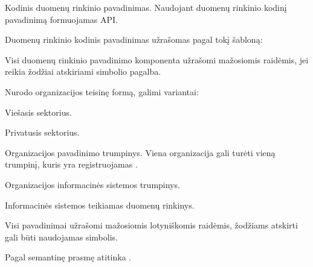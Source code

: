 \documentclass[letterpaper,10pt,lithuanian]{sphinxmanual}
\begin{document}
\begin{fulllineitems}
\label{\detokenize{formatas:dataset}}
\pysigstartsignatures
{}
\pysigstopsignatures
\sphinxAtStartPar
{}

\sphinxAtStartPar
Kodinis duomenų rinkinio pavadinimas. Naudojant duomenų rinkinio kodinį
pavadinimą formuojamas API.

\sphinxAtStartPar
Duomenų rinkinio kodinis pavadinimas užrašomas pagal tokį šabloną:

\sphinxAtStartPar
{}  \sphinxcode{\sphinxupquote{/}}  \sphinxcode{\sphinxupquote{/}}  \sphinxcode{\sphinxupquote{/}} 

\sphinxAtStartPar
Visi duomenų rinkinio pavadinimo komponenta užrašomi mažosiomis raidėmis,
jei reikia žodžiai atskiriami \sphinxcode{\sphinxupquote{\_}} simbolio pagalba.
\begin{description}
\sphinxAtStartPar
Nurodo organizacijos teisinę formą, galimi variantai:

\begin{DUlineblock}{0em}
\item[]  \sphinxhyphen{} Viešasis sektorius.
\item[]  \sphinxhyphen{} Privatusis sektorius.
\end{DUlineblock}

\sphinxAtStartPar
Organizacijos pavadinimo trumpinys. Viena organizacija gali turėti
vieną trumpinį, kuris yra registruojamas {\hyperref[\detokenize{savokos:term-duomenu-katalogas}]{}}.

\sphinxAtStartPar
Organizacijos informacinės sistemos trumpinys.

\sphinxAtStartPar
Informacinės sistemos teikiamas duomenų rinkinys.

\end{description}

\sphinxAtStartPar
Visi pavadinimai užrašomi mažosiomis lotyniškomis raidėmis, žodžiams
atskirti gali būti naudojamas \sphinxcode{\sphinxupquote{\_}} simbolis.

\sphinxAtStartPar
Pagal semantinę prasmę atitinka .


\end{fulllineitems}
\end{document}
